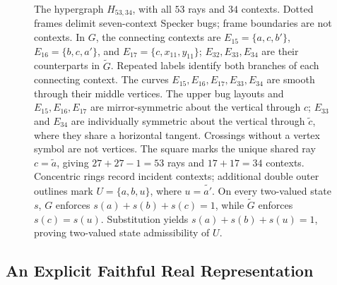 \documentclass[aps,pra,reprint,superscriptaddress,longbibliography,nofootinbib,floatfix,10pt]{revtex4-2}
\theoremstyle{definition}\newtheorem{definition}[theorem]{Definition}
\theoremstyle{remark}\newtheorem{remark}[theorem]{Remark}
\begin{document}
\begin{figure}[!t]
\caption{The hypergraph $H_{53,34}$, with all $53$ rays and $34$ contexts. Dotted frames delimit seven-context Specker bugs; frame boundaries are not contexts. In $G$, the connecting contexts are $E_{15}=\{a,c,b'\}$, $E_{16}=\{b,c,a'\}$, and $E_{17}=\{c,x_{11},y_{11}\}$; $E_{32},E_{33},E_{34}$ are their counterparts in $\widetilde G$. Repeated labels identify both branches of each connecting context. The curves $E_{15},E_{16},E_{17},E_{33},E_{34}$ are smooth through their middle vertices. The upper bug layouts and $E_{15},E_{16},E_{17}$ are mirror-symmetric about the vertical through $c$; $E_{33}$ and $E_{34}$ are individually symmetric about the vertical through $\widetilde c$, where they share a horizontal tangent. Crossings without a vertex symbol are not vertices. The square marks the unique shared ray $c=\widetilde a$, giving $27+27-1=53$ rays and $17+17=34$ contexts. Concentric rings record incident contexts; additional double outer outlines mark $U=\{a,b,u\}$, where $u=\widetilde{a'}$. On every two-valued state $s$, $G$ enforces $s(a)+s(b)+s(c)=1$, while $\widetilde G$ enforces $s(c)=s(u)$. Substitution yields $s(a)+s(b)+s(u)=1$, proving two-valued state admissibility of $U$.}\label{fig:H53-34}
\end{figure}


\subsection{An Explicit Faithful Real Representation}
\end{document}

